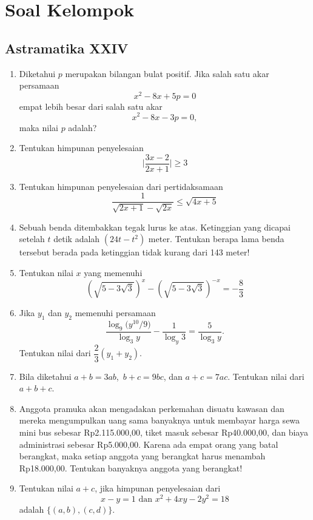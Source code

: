 \chapter{Soal Kelompok}
\section{Astramatika XXIV}

\begin{enumerate}
\item Diketahui $p$ merupakan bilangan bulat positif. Jika salah satu akar persamaan \[x^2-8x+5p=0\] empat lebih besar dari salah satu akar \[x^2-8x-3p=0,\]maka nilai $p$ adalah?

\item Tentukan himpunan penyelesaian \[\biggl\lvert\frac{3x-2}{2x+1}\biggr\rvert\geq 3\]

\item Tentukan himpunan penyelesaian dari pertidaksamaan \[\frac{1}{\sqrt{2x+1}-\sqrt{2x}} \leq \sqrt{4x+5}\]

\item Sebuah benda ditembakkan tegak lurus ke atas. Ketinggian yang dicapai setelah $t$ detik adalah $(24t-t^2)$ meter. Tentukan berapa lama benda tersebut berada pada ketinggian tidak kurang dari 143 meter!

\item Tentukan nilai $x$ yang memenuhi \[\left(\sqrt{5-3\sqrt{3}}\right)^x - \left(\sqrt{5-3\sqrt{3}}\right)^{-x} = -\frac{8}{3}\]

\item Jika $y_1$ dan $y_2$ memenuhi persamaan \[\frac{\log_9 \bigl(y^{10}/9\bigr)}{\log_3 y} - \frac{1}{\log_y 3} = \frac{5}{\log_3 y}.\] Tentukan nilai dari $\dfrac{2}{3}(y_1+y_2)$.

\item Bila diketahui $a+b=3ab$,\ $b+c=9bc$, dan $a+c=7ac$. Tentukan nilai dari $a+b+c$.

\item Anggota pramuka akan mengadakan perkemahan disuatu kawasan dan mereka mengumpulkan uang sama banyaknya untuk membayar harga sewa mini bus sebesar Rp2.115.000,00, tiket masuk sebesar Rp40.000,00, dan biaya administrasi sebesar Rp5.000,00. Karena ada empat orang yang batal berangkat, maka setiap anggota yang berangkat harus menambah Rp18.000,00. Tentukan banyaknya anggota yang berangkat!

\item Tentukan nilai $a+c$, jika himpunan penyelesaian dari \[x-y=1\text{ dan }x^2+4xy-2y^2 = 18\] adalah $\{(a,b), (c,d)\}$.


\end{enumerate}
